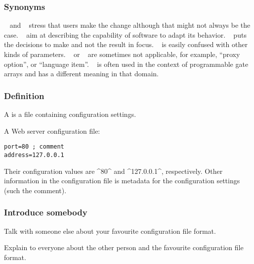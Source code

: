 \documentclass{beamer}
\begin{document}
\begin{frame}[fragile]
	\frametitle{Synonyms}
~\cite{jin2014configurations} and ~\cite{anderson2002researching} stress that users make the change although that might not always be the case.
~\cite{gunther2012software,rhein2016variability,villela2014survey,van2001notion,nadi2014mining,mens2016taxonomy} aim at describing the capability of software to adapt its behavior.
~\cite{software1993reuse,czarnecki2012cool} puts the decisions to make and not the result in focus.
~\cite{yin2011empirical,anderson1994towards} is easily confused with other kinds of parameters.
~\cite{anthony2009context} or ~\cite{rabkin2011static,zhang2013automated,zhang2014configuration} are sometimes not applicable, for example, ``proxy option'', or ``language item''.
~\cite{huang2015confvalley} is often used in the context of programmable gate arrays and has a different meaning in that domain.
\end{frame}

\begin{frame}[fragile]
	\frametitle{Definition}
	A  is a file containing configuration settings.

	\pause
	A Web server configuration file:

\begin{lstlisting}
port=80 ; comment
address=127.0.0.1\end{lstlisting}
	\pause

	Their configuration values are ^80^ and ^127.0.0.1^, respectively.
	Other information in the configuration file is metadata for the configuration settings (such the comment).
\end{frame}

\begin{frame}
	\frametitle{}
\end{frame}

\begin{assignment}
	\frametitle{Introduce somebody}
	\begin{task}
	Talk with someone else about your favourite configuration file format.
	\end{task}

	\begin{task}
	Explain to everyone about the other person and the favourite configuration file format.
	\end{task}
\end{assignment}
\end{document}
